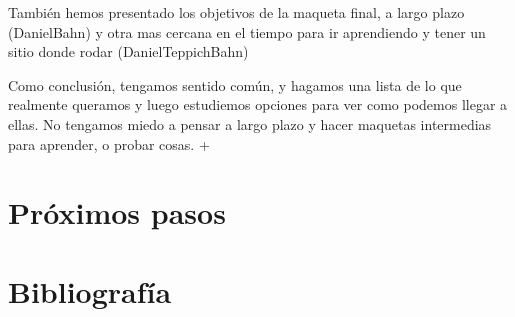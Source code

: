  

También hemos presentado los objetivos de la maqueta final, a largo plazo (DanielBahn) y otra mas cercana en el tiempo para ir aprendiendo y tener un sitio donde rodar (DanielTeppichBahn) 

 

Como conclusión, tengamos sentido común, y hagamos una lista de lo que realmente queramos y luego estudiemos opciones para ver como podemos llegar a ellas. No tengamos miedo a pensar a largo plazo y hacer maquetas intermedias para aprender, o probar cosas. +
\section{Próximos pasos}

\section{Bibliografía}
\printbibliography[heading=subbibliography]
